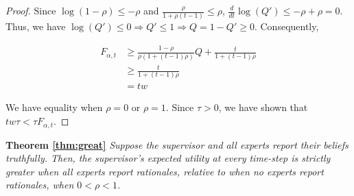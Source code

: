 \documentclass{winnower}
\begin{document}
\begin{proof}
Since $\log(1-\rho) \leq -\rho$ and $\frac{\rho}{1+\rho(t-1)} \leq \rho$, $\frac{d}{dt}\log(Q') \leq -\rho + \rho = 0$. Thus, we have $\log(Q') \leq 0 \Rightarrow Q' \leq 1 \Rightarrow Q = 1- Q' \geq 0$. Consequently,


    \begin{equation}
        \begin{split}
    F_{\alpha, t} &\geq \frac{ 1-\rho}{\rho\left( 1+(t-1)\rho\right)}Q  + \frac{t}{ 1+(t-1)\rho}\\
        &\geq \frac{t}{ 1+(t-1)\rho} \\
        &= tw
    \end{split}
    \end{equation}

    We have equality when $\rho = 0$ or $\rho = 1$. Since $\tau > 0$, we have shown that $tw\tau < \tau F_{\alpha, t}$. 
\end{proof}


\noindent\textbf{Theorem \ref{thm:great}}
    \emph{Suppose the supervisor and all experts report their beliefs truthfully. Then, the supervisor's expected utility at every time-step is strictly greater when all experts report rationales, relative to when no experts report rationales, when $0 < \rho < 1$.}
\end{document}

